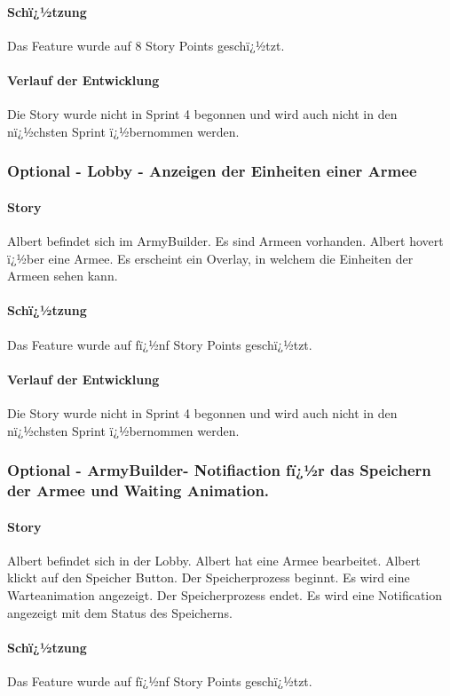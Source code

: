\documentclass[12pt, titlepage]{scrartcl}
\begin{document}
			\paragraph{Schï¿½tzung}
			Das Feature wurde auf 8 Story Points geschï¿½tzt.
			\paragraph{Verlauf der Entwicklung} 
			Die Story wurde nicht in Sprint 4 begonnen und wird auch nicht in den nï¿½chsten Sprint ï¿½bernommen werden.
			\subsubsection{Optional - Lobby - Anzeigen der Einheiten einer Armee}
			\paragraph{Story} Albert befindet sich im ArmyBuilder. Es sind Armeen vorhanden. Albert hovert ï¿½ber eine Armee. Es erscheint ein Overlay, in welchem die Einheiten der Armeen sehen kann.
			\paragraph{Schï¿½tzung}
			Das Feature wurde auf fï¿½nf Story Points geschï¿½tzt.
			\paragraph{Verlauf der Entwicklung} 
			Die Story wurde nicht in Sprint 4 begonnen und wird auch nicht in den nï¿½chsten Sprint ï¿½bernommen werden.
			\subsubsection{Optional - ArmyBuilder- Notifiaction fï¿½r das Speichern der Armee und Waiting Animation.}
			\paragraph{Story} Albert befindet sich in der Lobby. Albert hat eine Armee bearbeitet. Albert klickt auf den Speicher Button. Der Speicherprozess beginnt. Es wird eine Warteanimation angezeigt. Der Speicherprozess endet. Es wird eine Notification angezeigt mit dem Status des Speicherns.
			\paragraph{Schï¿½tzung}
			Das Feature wurde auf fï¿½nf Story Points geschï¿½tzt.
\end{document}
